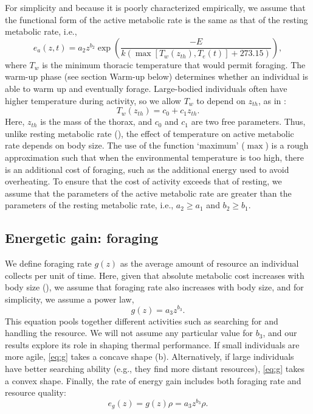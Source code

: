 For simplicity and because it is poorly characterized empirically, we assume that the functional form of the active metabolic rate is the same as that of the resting metabolic rate, i.e.,
\begin{equation} \label{eq:ea}
	e_a(z,t) = a_2 z^{b_2}  \exp \left(\frac{-E}{k (\max[T_w(z_{th}), T_e(t)]+ 273.15)} \right),
\end{equation}
where $T_w$ is the minimum thoracic temperature that would permit foraging.
The warm-up phase (see section Warm-up below) determines whether an individual is able to warm up and eventually forage. %
Large-bodied individuals often have higher temperature during activity, so we allow $T_w$ to depend on $z_{th}$, as in \citet{Bartholomew1977a}:
\begin{equation} \label{eq:Tw}
	T_w(z_{th}) = c_0+ c_1 z_{th}.
\end{equation}
Here, $z_{th}$ is the mass of the thorax, and $c_0$ and $c_1$ are two free parameters.
Thus, unlike resting metabolic rate (), the effect of temperature on active metabolic rate depends on body size.
The use of the function `maximum' ($\max$) is a rough approximation such that when the environmental temperature is too high, there is an additional cost of foraging, such as the additional energy used to avoid overheating.
To ensure that the cost of activity exceeds that of resting, we assume that the parameters of the active metabolic rate are greater than the parameters of the resting metabolic rate, i.e., $a_2 \geq a_1$ and $b_2 \geq b_1$. %

\subsection*{Energetic gain: foraging}

We define foraging rate $g(z)$ as the average amount of resource an individual collects per unit of time.
Here, given that absolute metabolic cost increases with body size (), we assume that foraging rate also increases with body size, and for simplicity, we assume a power law,
\begin{equation} \label{eq:g}
	g(z) = a_3 z^{b_3}.
\end{equation}
This equation pools together different activities such as searching for and handling the resource.
We will not assume any particular value for $b_3$, and our results explore its role in shaping thermal performance.
If small individuals are more agile, \cref{eq:g} takes a concave shape (b).
Alternatively, if large individuals have better searching ability (e.g., they find more distant resources), \cref{eq:g} takes a convex shape.
Finally, the rate of energy gain includes both foraging rate and resource quality:
\begin{equation} \label{eq:eg}
	e_g(z) = g(z) \rho = a_3 z^{b_3} \rho.
\end{equation}

